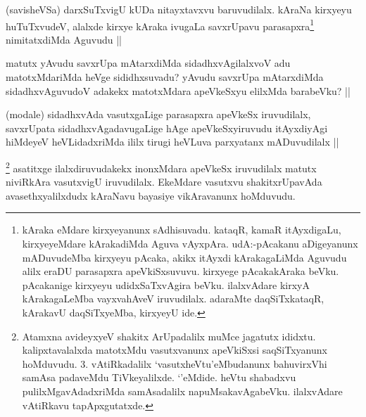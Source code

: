 
\begin{artha}
(savisheVSa) darxSuTxvigU kUDa nitayxtavxvu baruvudilalx. kAraNa kirxyeyu huTuTxvudeV, alalxde kirxye kAraka ivugaLa savxrUpavu parasapxra\footnote{kAraka eMdare kirxyeyanunx sAdhisuvadu. kataqR, kamaR itAyxdigaLu, kirxyeyeMdare kArakadiMda Aguva vAyxpAra. udA:-pAcakanu aDigeyanunx mADuvudeMba kirxyeyu pAcaka, akikx itAyxdi kArakagaLiMda Aguvudu alilx eraDU parasapxra apeVkiSxsuvuvu. kirxyege pAcakakAraka beVku. pAcakanige kirxyeyu udidxSaTxvAgira beVku. ilalxvAdare kirxyA kArakagaLeMba vayxvahAveV iruvudilalx. adaraMte daqSiTxkataqR, kArakavU daqSiTxyeMba, kirxyeyU ide.} nimitatxdiMda Aguvudu ||
\end{artha}


\begin{artha}
matutx yAvudu savxrUpa mAtarxdiMda sidadhxvAgilalxvoV adu matotxMdariMda heVge sididhxsuvadu? yAvudu savxrUpa mAtarxdiMda sidadhxvAguvudoV adakekx matotxMdara apeVkeSxyu elilxMda barabeVku? ||
\end{artha}


\begin{artha}
(modale) sidadhxvAda vasutxgaLige parasapxra apeVkeSx iruvudilalx, savxrUpata sidadhxvAgadavugaLige hAge apeVkeSxyiruvudu itAyxdiyAgi hiMdeyeV heVLidadxriMda ililx tirugi heVLuva parxyatanx mADuvudilalx ||
\end{artha}


\begin{artha}
\footnote{Atamxna avideyxyeV shakitx ArUpadalilx muMce jagatutx ididxtu. kalipxtavalalxda matotxMdu vasutxvanunx apeVkiSxsi saqSiTxyanunx hoMduvudu. 3. vAtiRkadalilx `vasutxheVtu'eMbudanunx bahuvirxVhi samAsa padaveMdu TiVkeyalilxde. `\stext'eMdide. heVtu shabadxvu pulilxMgavAdadxriMda samAsadalilx napuMsakavAgabeVku. ilalxvAdare vAtiRkavu tapApxgutatxde.}
asatitxge ilalxdiruvudakekx inonxMdara apeVkeSx iruvudilalx matutx niviRkAra vasutxvigU iruvudilalx. EkeMdare vasutxvu shakitxrUpavAda avasethxyalilxdudx kAraNavu bayasiye vikAravanunx hoMduvudu.
\end{artha}

